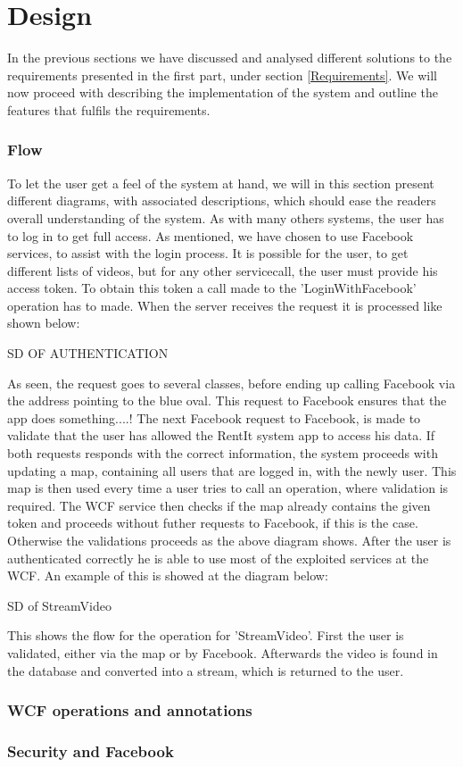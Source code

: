 \part{Design}
In the previous sections we have discussed and analysed different solutions to the requirements presented in the first part, under section \ref{Requirements}. We will now proceed with describing the implementation of the system and outline the features that fulfils the requirements.

\section{Flow}
To let the user get a feel of the system at hand, we will in this section present different diagrams, with associated descriptions, which should ease the readers overall understanding of the system.
As with many others systems, the user has to log in to get full access. As mentioned, we have chosen to use Facebook services, to assist with the login process. It is possible for the user, to get different lists of videos, but for any other servicecall, the user must provide his access token. To obtain this token a call made to the 'LoginWithFacebook' operation has to made. When the server receives the request it is processed like shown below:

SD OF AUTHENTICATION

As seen, the request goes to several classes, before ending up calling Facebook via the address pointing to the blue oval. This request to Facebook ensures that the app does something....!
The next Facebook request to Facebook, is made to validate that the user has allowed the RentIt system app to access his data. If both requests responds with the correct information, the system proceeds with updating a map, containing all users that are logged in, with the newly user. This map is then used every time a user tries to call an operation, where validation is required. The WCF service then checks if the map already contains the given token and proceeds without futher requests to Facebook, if this is the case. Otherwise the validations proceeds as the above diagram shows. 
After the user is authenticated correctly he is able to use most of the exploited services at the WCF. An example of this is showed at the diagram below:

SD of StreamVideo

This shows the flow for the operation for 'StreamVideo'. First the user is validated, either via the map or by Facebook. Afterwards the video is found in the database and converted into a stream, which is returned to the user. 


\section{WCF operations and annotations}


\section{Security and Facebook}

